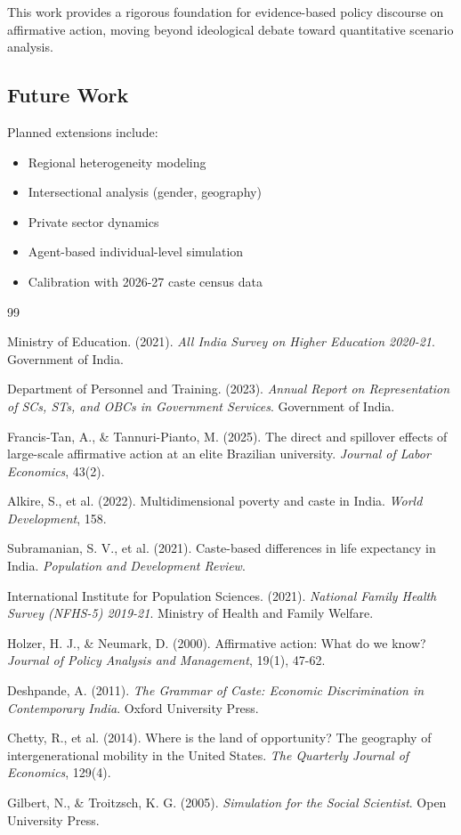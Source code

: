 \documentclass[10pt,twocolumn]{article}
\begin{document}
This work provides a rigorous foundation for evidence-based policy discourse on affirmative action, moving beyond ideological debate toward quantitative scenario analysis.

\subsection{Future Work}

Planned extensions include:
\begin{itemize}
    \item Regional heterogeneity modeling
    \item Intersectional analysis (gender, geography)
    \item Private sector dynamics
    \item Agent-based individual-level simulation
    \item Calibration with 2026-27 caste census data
\end{itemize}

\begin{thebibliography}{99}

Ministry of Education. (2021). \textit{All India Survey on Higher Education 2020-21}. Government of India.

Department of Personnel and Training. (2023). \textit{Annual Report on Representation of SCs, STs, and OBCs in Government Services}. Government of India.

Francis-Tan, A., \& Tannuri-Pianto, M. (2025). The direct and spillover effects of large-scale affirmative action at an elite Brazilian university. \textit{Journal of Labor Economics}, 43(2).

Alkire, S., et al. (2022). Multidimensional poverty and caste in India. \textit{World Development}, 158.

Subramanian, S. V., et al. (2021). Caste-based differences in life expectancy in India. \textit{Population and Development Review}.

International Institute for Population Sciences. (2021). \textit{National Family Health Survey (NFHS-5) 2019-21}. Ministry of Health and Family Welfare.

Holzer, H. J., \& Neumark, D. (2000). Affirmative action: What do we know? \textit{Journal of Policy Analysis and Management}, 19(1), 47-62.

Deshpande, A. (2011). \textit{The Grammar of Caste: Economic Discrimination in Contemporary India}. Oxford University Press.

Chetty, R., et al. (2014). Where is the land of opportunity? The geography of intergenerational mobility in the United States. \textit{The Quarterly Journal of Economics}, 129(4).

Gilbert, N., \& Troitzsch, K. G. (2005). \textit{Simulation for the Social Scientist}. Open University Press.

\end{thebibliography}
\end{document}
